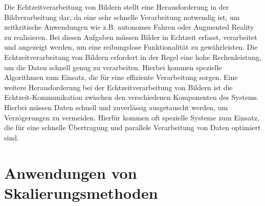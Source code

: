     Die Echtzeitverarbeitung von Bildern stellt eine Herausforderung in der Bildverarbeitung dar, da eine sehr schnelle Verarbeitung notwendig ist, um zeitkritische Anwendungen wie z.B. autonomes Fahren oder Augmented Reality zu realisieren.
    Bei diesen Aufgaben müssen Bilder in Echtzeit erfasst, verarbeitet und angezeigt werden, um eine reibungslose Funktionalität zu gewährleisten.
    Die Echtzeitverarbeitung von Bildern erfordert in der Regel eine hohe Rechenleistung, um die Daten schnell genug zu verarbeiten.
    Hierbei kommen spezielle Algorithmen zum Einsatz, die für eine effiziente Verarbeitung sorgen.
    Eine weitere Herausforderung bei der Echtzeitverarbeitung von Bildern ist die Echtzeit-Kommunikation zwischen den verschiedenen Komponenten des Systems. 
    Hierbei müssen Daten schnell und zuverlässig ausgetauscht werden, um Verzögerungen zu vermeiden. 
    Hierfür kommen oft spezielle Systeme zum Einsatz, die für eine schnelle Übertragung und parallele Verarbeitung von Daten optimiert sind.
\section{Anwendungen von Skalierungsmethoden}
\newpage